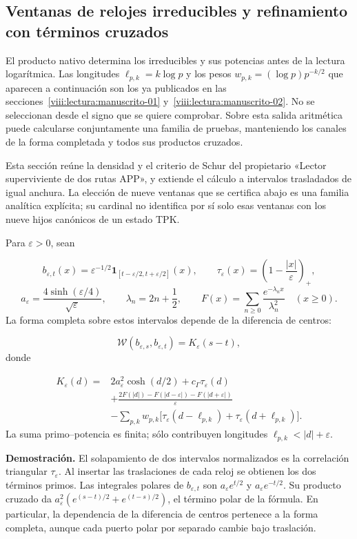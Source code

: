 \subsection{Ventanas de relojes irreducibles y refinamiento con términos cruzados}
\label{viii:rz:ventanas}
El producto nativo determina los irreducibles y sus potencias antes de la lectura logarítmica. Las longitudes \(\ell_{p,k}=k\log p\) y los pesos \(w_{p,k}=(\log p)p^{-k/2}\) que aparecen a continuación son los ya publicados en las secciones~\ref{viii:lectura:manuscrito-01} y~\ref{viii:lectura:manuscrito-02}. No se seleccionan desde el signo que se quiere comprobar. Sobre esta salida aritmética puede calcularse conjuntamente una familia de pruebas, manteniendo los canales de la forma completada y todos sus productos cruzados.

Esta sección reúne la densidad y el criterio de Schur del propietario «Lector superviviente de dos rutas APP», y extiende el cálculo a intervalos trasladados de igual anchura. La elección de nueve ventanas que se certifica abajo es una familia analítica explícita; su cardinal no identifica por sí solo esas ventanas con los nueve hijos canónicos de un estado TPK.

Para \(\varepsilon>0\), sean

\[
b_{\varepsilon,t}(x)=\varepsilon^{-1/2}
\mathbf1_{[t-\varepsilon/2,t+\varepsilon/2]}(x),\qquad
\tau_\varepsilon(x)=\left(1-\frac{|x|}{\varepsilon}\right)_+,
\]
\[
a_\varepsilon=\frac{4\sinh(\varepsilon/4)}{\sqrt\varepsilon},
\qquad \lambda_n=2n+\frac12,\qquad
F(x)=\sum_{n\geq0}\frac{e^{-\lambda_nx}}{\lambda_n^2}
\quad(x\geq0).
\]
La forma completa sobre estos intervalos depende de la diferencia de centros:

\[
\mathscr W(b_{\varepsilon,s},b_{\varepsilon,t})
=K_\varepsilon(s-t),
\]
donde

\[
\begin{aligned}
K_\varepsilon(d)={}&2a_\varepsilon^2\cosh(d/2)
+c_\Gamma\tau_\varepsilon(d)\\
&+\frac{2F(|d|)-F(|d-\varepsilon|)-F(|d+\varepsilon|)}{\varepsilon}\\
&-\sum_{p,k}w_{p,k}\bigl[
\tau_\varepsilon(d-\ell_{p,k})+
\tau_\varepsilon(d+\ell_{p,k})\bigr].
\end{aligned}
\]
La suma primo–potencia es finita; sólo contribuyen longitudes \(\ell_{p,k}<|d|+\varepsilon\).

\textbf{Demostración.} El solapamiento de dos intervalos normalizados es la correlación triangular \(\tau_\varepsilon\). Al insertar las traslaciones de cada reloj se obtienen los dos términos primos. Las integrales polares de \(b_{\varepsilon,t}\) son \(a_\varepsilon e^{t/2}\) y \(a_\varepsilon e^{-t/2}\). Su producto cruzado da \(a_\varepsilon^2(e^{(s-t)/2}+e^{(t-s)/2})\), el término polar de la fórmula. En particular, la dependencia de la diferencia de centros pertenece a la forma completa, aunque cada puerto polar por separado cambie bajo traslación.

